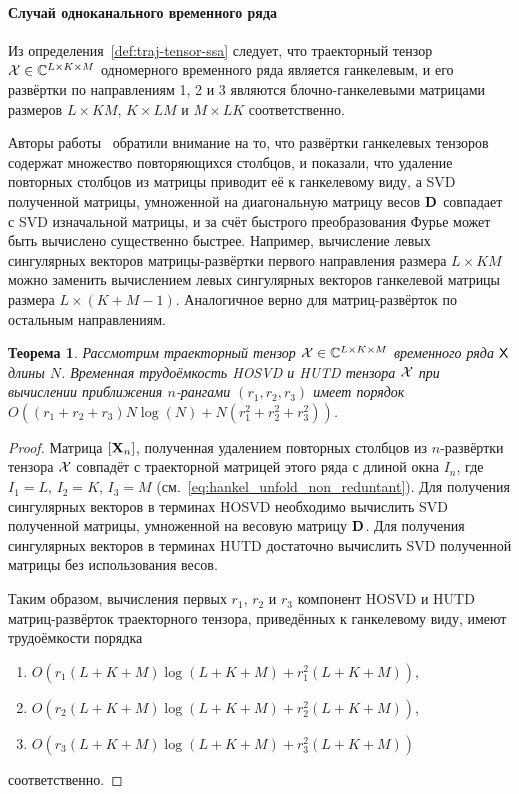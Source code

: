 \documentclass[specialist,
  substylefile = spbu.rtx,
subf,href,colorlinks=true, 12pt]{disser}
\theoremstyle{plain}
\newtheorem{theorem}{Теорема}[section]
\theoremstyle{definition}
\theoremstyle{remark}
\def\newdecomp/{HUTD}
\begin{document}
\paragraph{Случай одноканального временного ряда}
Из определения~\ref{def:traj-tensor-ssa} следует, что
траекторный тензор  $\mathcal{X}\in \mathbb{C}^{L \times K \times M}$
одномерного временного ряда является ганкелевым, и его развёртки по
направлениям 1, 2 и 3 являются блочно-ганкелевыми матрицами размеров
$L \times KM$, $K \times LM$ и
$M \times LK$ соответственно.

Авторы работы~\cite{Badeau2008} обратили внимание на то, что
развёртки ганкелевых тензоров содержат множество повторяющихся
столбцов, и показали, что удаление повторных столбцов из матрицы приводит её к
ганкелевому виду, а SVD полученной матрицы, умноженной на
диагональную матрицу весов $\mathbf{D}$ совпадает с SVD изначальной
матрицы, и за счёт быстрого преобразования Фурье может быть вычислено
существенно быстрее.
Например, вычисление левых сингулярных векторов матрицы-развёртки
первого направления размера $L \times KM$ можно заменить вычислением
левых сингулярных векторов ганкелевой матрицы размера $L \times (K + M - 1)$.
Аналогичное верно для матриц-развёрток по остальным направлениям.

\begin{theorem}\label{theorem:tssa-complexity-decomp}
  Рассмотрим траекторный тензор $\mathcal{X}\in \mathbb{C}^{L \times K \times M}$
  временного ряда $\mathsf{X}$ длины $N$.
  Временная трудоёмкость HOSVD и \newdecomp/ тензора $\mathcal{X}$ при
  вычислении приближения $n$-рангами $(r_1, r_2, r_3)$ имеет порядок
  $O((r_1 + r_2 + r_3) N \log(N) + N(r_1^2 + r_2^2 + r_3^2))$.
\end{theorem}
\begin{proof}
  Матрица $[\mathbf{X}_n]$, полученная удалением повторных столбцов из
  $n$-\linebreak развёртки тензора $\mathcal{X}$ совпадёт с траекторной матрицей
  этого ряда с длиной окна $I_n$, где $I_1 = L,\, I_2 = K,\, I_3 =
  M$ (см.~\eqref{eq:hankel_unfold_non_reduntant}).
  Для получения сингулярных векторов в терминах HOSVD необходимо
  вычислить SVD полученной матрицы, умноженной на весовую матрицу $\mathbf{D}$. Для
  получения сингулярных векторов в терминах \newdecomp/ достаточно вычислить
  SVD полученной матрицы без использования весов.

  Таким образом, вычисления первых $r_1$, $r_2$ и $r_3$ компонент HOSVD
  и \newdecomp/
  матриц-развёрток траекторного тензора, приведённых к ганкелевому виду, имеют
  трудоёмкости порядка
  \begin{enumerate}
    \item $O(r_1 (L + K + M) \log(L + K + M) + r_1^2 (L + K + M))$,
    \item $O(r_2 (L + K + M) \log(L + K + M) + r_2^2 (L + K + M))$,
    \item $O(r_3 (L + K + M) \log(L + K + M) + r_3^2 (L + K + M))$
  \end{enumerate}
  соответственно.
\end{proof}
\end{document}
